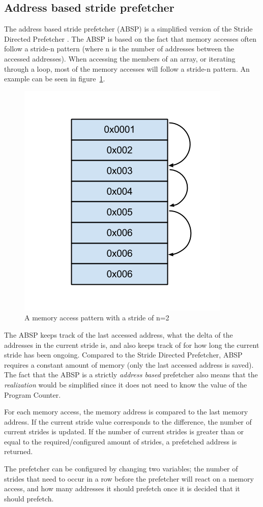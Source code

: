 \subsection{Address based stride prefetcher}
\label{sec:stridePrefetcher}
The address based stride prefetcher (ABSP) is a simplified version of
the Stride Directed Prefetcher \cite{stride}. The ABSP is based on the fact that
memory accesses often follow a stride-n pattern (where n is the number
of addresses between the accessed addresses). When accessing the
members of an array, or iterating through a loop, most of the memory
accesses will follow a stride-n pattern. An example can be seen in
figure~\ref{fig:stride}.

\begin{figure}[H]
\centerline{\includegraphics[scale=0.5]{./figures/stride}}
\caption{A memory access pattern with a stride of n=2}
\label{fig:stride}
\end{figure}

The ABSP keeps track of the last accessed address, what the delta of the addresses in the current stride is, and
also keeps track of for how long the current stride has been
ongoing. Compared to the Stride Directed Prefetcher, ABSP requires a constant amount of memory (only the last accessed address is saved). The fact that the ABSP is a strictly \emph{address based} prefetcher also means that the \emph{realization} would be simplified since it does not need to know the value of the Program Counter.

For each memory access, the memory address is compared to the last
memory address. If the current stride value corresponds to the
difference, the number of current strides is updated. If the number of
current strides is greater than or equal to the required/configured
amount of strides, a prefetched address is returned.  

The prefetcher can be configured by changing two variables;
the number of strides that need to occur in a row before
the prefetcher will react on a memory access, and how many addresses it should prefetch once it is decided that it should prefetch.

